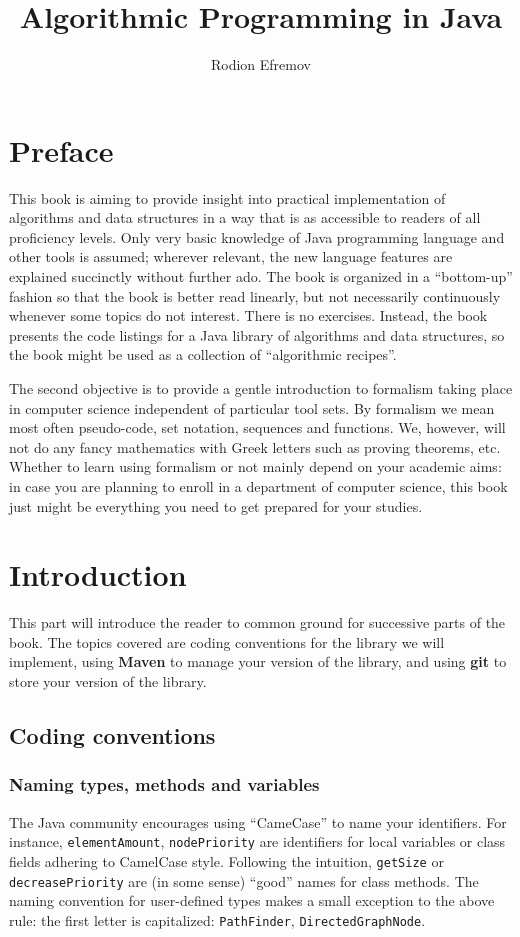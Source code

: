 \documentclass{book}
\title{Algorithmic Programming in Java}
\author{Rodion Efremov}
\begin{document}
\maketitle

\part*{Preface}
This book is aiming to provide insight into practical implementation of algorithms and data structures in a way that is as accessible to readers of all proficiency levels. Only very basic knowledge of Java programming language and other tools is assumed; wherever relevant, the new language features are explained succinctly without further ado. The book is organized in a ``bottom-up'' fashion so that the book is better read linearly, but not necessarily continuously whenever some topics do not interest. There is no exercises. Instead, the book presents the code listings for a Java library of algorithms and data structures, so the book might be used as a collection of ``algorithmic recipes''. 

The second objective is to provide a gentle introduction to formalism taking place in computer science independent of particular tool sets. By formalism we mean most often pseudo-code, set notation, sequences and functions. We, however, will not do any fancy mathematics with Greek letters such as proving theorems, etc. Whether to learn using formalism or not mainly depend on your academic aims: in case you are planning to enroll in a department of computer science, this book just might be everything you need to get prepared for your studies.

\part{Introduction}
This part will introduce the reader to common ground for successive parts of the book. The topics covered are coding conventions for the library we will implement, using \textbf{Maven} to manage your version of the library, and using \textbf{git} to store your version of the library.

\chapter{Coding conventions}

\section{Naming types, methods and variables}
The Java community encourages using ``CameCase'' to name your identifiers. For instance, \texttt{elementAmount}, \texttt{nodePriority} are identifiers for local variables or class fields adhering to CamelCase style. Following the intuition, \texttt{getSize} or \texttt{decreasePriority} are (in some sense) ``good'' names for class methods. The naming convention for user-defined types makes a small exception to the above rule: the first letter is capitalized: \texttt{PathFinder}, \texttt{DirectedGraphNode}.
\end{document}
